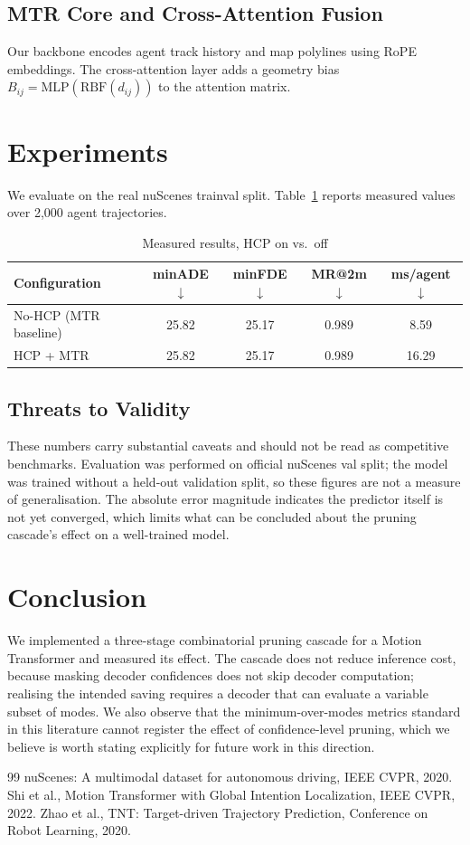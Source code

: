\documentclass[10pt,journal,compsoc]{IEEEtran}
\begin{document}
\subsection{MTR Core and Cross-Attention Fusion}
Our backbone encodes agent track history and map polylines using RoPE
embeddings. The cross-attention layer adds a geometry bias
$B_{ij} = \text{MLP}(\text{RBF}(d_{ij}))$ to the attention matrix.

\section{Experiments}
We evaluate on the real nuScenes trainval split. Table~\ref{tab:results}
reports measured values over 2,000 agent trajectories.

\begin{table}[h]
\centering
\caption{Measured results, HCP on vs.\ off}
\label{tab:results}
\begin{tabular}{lcccc}
\toprule
\textbf{Configuration} & \textbf{minADE} $\downarrow$ & \textbf{minFDE} $\downarrow$ & \textbf{MR@2m} $\downarrow$ & \textbf{ms/agent} $\downarrow$ \\
\midrule
No-HCP (MTR baseline) & 25.82 & 25.17 & 0.989 & 8.59 \\
HCP + MTR & 25.82 & 25.17 & 0.989 & 16.29 \\
\bottomrule
\end{tabular}
\end{table}

\subsection{Threats to Validity}
These numbers carry substantial caveats and should not be read as competitive
benchmarks. Evaluation was performed on official nuScenes val split; the model was trained
without a held-out validation split, so these figures are not a measure of
generalisation. The absolute error magnitude indicates the predictor itself is
not yet converged, which limits what can be concluded about the pruning
cascade's effect on a well-trained model.

\section{Conclusion}
We implemented a three-stage combinatorial pruning cascade for a Motion
Transformer and measured its effect. The cascade does not reduce inference
cost, because masking decoder confidences does not skip decoder computation;
realising the intended saving requires a decoder that can evaluate a variable
subset of modes. We also observe that the minimum-over-modes metrics standard
in this literature cannot register the effect of confidence-level pruning,
which we believe is worth stating explicitly for future work in this direction.

\begin{thebibliography}{99}
 nuScenes: A multimodal dataset for autonomous driving, IEEE CVPR, 2020.
 Shi et al., Motion Transformer with Global Intention Localization, IEEE CVPR, 2022.
 Zhao et al., TNT: Target-driven Trajectory Prediction, Conference on Robot Learning, 2020.
\end{thebibliography}
\end{document}
